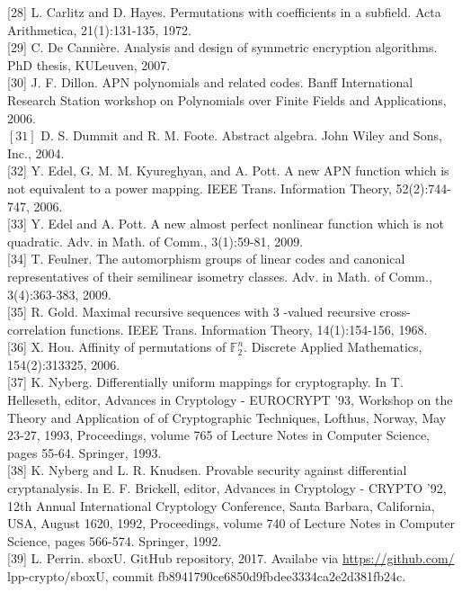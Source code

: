 \documentclass[10pt]{article}
\begin{document}
[28] L. Carlitz and D. Hayes. Permutations with coefficients in a subfield. Acta Arithmetica, 21(1):131-135, 1972.\\[0pt]
[29] C. De Cannière. Analysis and design of symmetric encryption algorithms. PhD thesis, KULeuven, 2007.\\[0pt]
[30] J. F. Dillon. APN polynomials and related codes. Banff International Research Station workshop on Polynomials over Finite Fields and Applications, 2006.\\
$[31]$ D. S. Dummit and R. M. Foote. Abstract algebra. John Wiley and Sons, Inc., 2004.\\[0pt]
[32] Y. Edel, G. M. M. Kyureghyan, and A. Pott. A new APN function which is not equivalent to a power mapping. IEEE Trans. Information Theory, 52(2):744-747, 2006.\\[0pt]
[33] Y. Edel and A. Pott. A new almost perfect nonlinear function which is not quadratic. Adv. in Math. of Comm., 3(1):59-81, 2009.\\[0pt]
[34] T. Feulner. The automorphism groups of linear codes and canonical representatives of their semilinear isometry classes. Adv. in Math. of Comm., 3(4):363-383, 2009.\\[0pt]
[35] R. Gold. Maximal recursive sequences with 3 -valued recursive cross-correlation functions. IEEE Trans. Information Theory, 14(1):154-156, 1968.\\[0pt]
[36] X. Hou. Affinity of permutations of $\mathbb{F}_{2}^{n}$. Discrete Applied Mathematics, 154(2):313325, 2006.\\[0pt]
[37] K. Nyberg. Differentially uniform mappings for cryptography. In T. Helleseth, editor, Advances in Cryptology - EUROCRYPT '93, Workshop on the Theory and Application of of Cryptographic Techniques, Lofthus, Norway, May 23-27, 1993, Proceedings, volume 765 of Lecture Notes in Computer Science, pages 55-64. Springer, 1993.\\[0pt]
[38] K. Nyberg and L. R. Knudsen. Provable security against differential cryptanalysis. In E. F. Brickell, editor, Advances in Cryptology - CRYPTO '92, 12th Annual International Cryptology Conference, Santa Barbara, California, USA, August 1620, 1992, Proceedings, volume 740 of Lecture Notes in Computer Science, pages 566-574. Springer, 1992.\\[0pt]
[39] L. Perrin. sboxU. GitHub repository, 2017. Availabe via \href{https://github.com/}{https://github.com/} lpp-crypto/sboxU, commit fb8941790ce6850d9fbdee3334ca2e2d381fb24c.\\[0pt]
\end{document}
